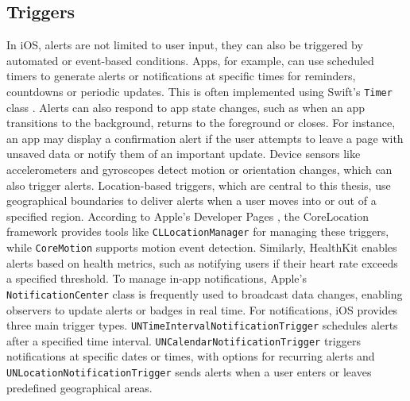 \subsection{Triggers}
In iOS, alerts are not limited to user input, they can also be triggered by automated or event-based conditions. 
Apps, for example, can use scheduled timers to generate alerts or notifications at specific times for reminders, countdowns or periodic updates. 
This is often implemented using Swift's \lstinline{Timer} class \cite{apple_timer}.
Alerts can also respond to app state changes, such as when an app transitions to the background, returns to the foreground or closes. 
For instance, an app may display a confirmation alert if the user attempts to leave a page with unsaved data or notify them of an important update.
Device sensors like accelerometers and gyroscopes detect motion or orientation changes, which can also trigger alerts.
Location-based triggers, which are central to this thesis, use geographical boundaries to deliver alerts when a user moves into or out of a specified region.
According to Apple's Developer Pages \cite{apple_corelocation, apple_coremotion}, the CoreLocation framework provides tools like \lstinline{CLLocationManager} for managing these triggers, while \lstinline{CoreMotion} supports motion event detection. 
Similarly, HealthKit \cite{apple_healthkit} enables alerts based on health metrics, such as notifying users if their heart rate exceeds a specified threshold.
To manage in-app notifications, Apple's \lstinline{NotificationCenter} \cite{apple_notificationcenter} class is frequently used to broadcast data changes, enabling observers to update alerts or badges in real time. 
For notifications, iOS provides three main trigger types. 
\lstinline{UNTimeIntervalNotificationTrigger} \cite{apple_time_trigger} schedules alerts after a specified time interval. 
\lstinline{UNCalendarNotificationTrigger} \cite{apple_calender_trigger} triggers notifications at specific dates or times, with options for recurring alerts and \lstinline{UNLocationNotificationTrigger} \cite{apple_location_trigger} sends alerts when a user enters or leaves predefined geographical areas.

